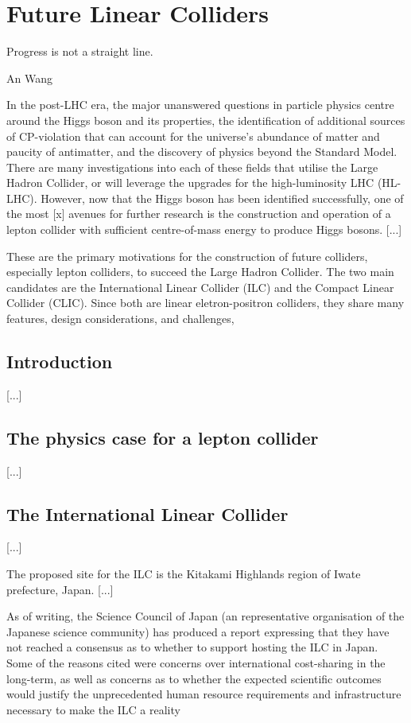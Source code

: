 \chapter{Future Linear Colliders}

\epigraph{Progress is not a straight line.}{An Wang}

In the post-LHC era, the major unanswered questions in particle physics centre around the Higgs boson and its properties, the identification of additional sources of CP-violation that can account for the universe's abundance of matter and paucity of antimatter, and the discovery of physics beyond the Standard Model. There are many investigations into each of these fields that utilise the Large Hadron Collider, or will leverage the upgrades for the high-luminosity LHC (HL-LHC). However, now that the Higgs boson has been identified successfully, one of the most [x] avenues for further research is the construction and operation of a lepton collider with sufficient centre-of-mass energy to produce Higgs bosons. [...]

These are the primary motivations for the construction of future colliders, especially lepton colliders, to succeed the Large Hadron Collider. The two main candidates are the International Linear Collider (ILC) and  the Compact Linear Collider (CLIC). Since both are linear eletron-positron colliders, they share many features, design considerations, and challenges, 

\section{Introduction}
[...]

\section{The physics case for a lepton collider}
[...]

\section{The International Linear Collider}
[...]

The proposed site for the ILC is the Kitakami Highlands region of Iwate prefecture, Japan. [...]

As of writing, the Science Council of Japan (an representative organisation of the Japanese science community) has produced a report expressing that they have not reached a consensus as to whether to support hosting the ILC in Japan. Some  of the reasons cited were concerns over international cost-sharing in the long-term, as well as concerns as to whether the expected scientific outcomes would justify the unprecedented human resource requirements and infrastructure necessary to make the ILC a reality \cite{linearcolliders-scj-report}

